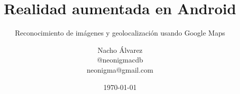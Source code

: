 \documentclass{beamer}
\begin{document}
\title{Realidad aumentada en Android}
\subtitle{Reconocimiento de imágenes y geolocalización usando Google Maps}
\author[Nacho Álvarez]{\texorpdfstring{Nacho Álvarez
  \\ \faTwitter \hspace{5pt}@neonigmacdb
  \\ \faEnvelope \hspace{5pt}neonigma@gmail.com}{Author}}

\date{\today}




\section[Índice]{}
\frame{\tableofcontents}








\end{document}
